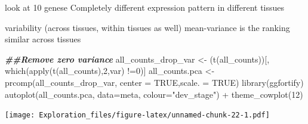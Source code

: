 \documentclass[
]{article}
\newenvironment{Shaded}{\begin{snugshade}}{\end{snugshade}}
\newcommand{\AttributeTok}[1]{\textcolor[rgb]{0.77,0.63,0.00}{#1}}
\newcommand{\ConstantTok}[1]{\textcolor[rgb]{0.00,0.00,0.00}{#1}}
\newcommand{\DecValTok}[1]{\textcolor[rgb]{0.00,0.00,0.81}{#1}}
\newcommand{\DocumentationTok}[1]{\textcolor[rgb]{0.56,0.35,0.01}{\textbf{\textit{#1}}}}
\newcommand{\FunctionTok}[1]{\textcolor[rgb]{0.00,0.00,0.00}{#1}}
\newcommand{\NormalTok}[1]{#1}
\newcommand{\OtherTok}[1]{\textcolor[rgb]{0.56,0.35,0.01}{#1}}
\newcommand{\SpecialCharTok}[1]{\textcolor[rgb]{0.00,0.00,0.00}{#1}}
\newcommand{\StringTok}[1]{\textcolor[rgb]{0.31,0.60,0.02}{#1}}
\begin{document}
look at 10 genese Completely different expression pattern in different
tissues

variability (across tissues, within tissues as well) mean-variance is
the ranking similar across tissues

\begin{Shaded}
\begin{Highlighting}[]
\DocumentationTok{\#\#Remove zero variance }
\NormalTok{all\_counts\_drop\_var }\OtherTok{\textless{}{-}}\NormalTok{ (}\FunctionTok{t}\NormalTok{(all\_counts))[, }\FunctionTok{which}\NormalTok{(}\FunctionTok{apply}\NormalTok{(}\FunctionTok{t}\NormalTok{(all\_counts),}\DecValTok{2}\NormalTok{,var) }\SpecialCharTok{!=}\DecValTok{0}\NormalTok{)]}
\NormalTok{all\_counts.pca }\OtherTok{\textless{}{-}} \FunctionTok{prcomp}\NormalTok{(all\_counts\_drop\_var, }\AttributeTok{center =} \ConstantTok{TRUE}\NormalTok{,}\AttributeTok{scale. =} \ConstantTok{TRUE}\NormalTok{)}
\FunctionTok{library}\NormalTok{(ggfortify)}
\FunctionTok{autoplot}\NormalTok{(all\_counts.pca, }\AttributeTok{data=}\NormalTok{meta, }\AttributeTok{colour=}\StringTok{"dev\_stage"}\NormalTok{) }\SpecialCharTok{+} \FunctionTok{theme\_cowplot}\NormalTok{(}\DecValTok{12}\NormalTok{)}
\end{Highlighting}
\end{Shaded}

\texttt{[image: Exploration\_files/figure-latex/unnamed-chunk-22-1.pdf]}
\end{document}
